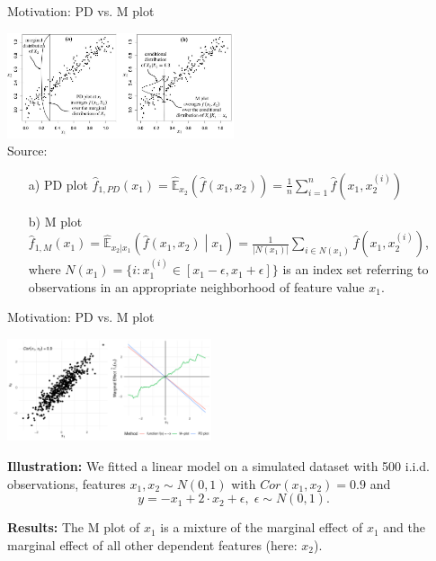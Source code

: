 \documentclass[aspectratio=169]{../latex_main/tntbeamer}  %
\begin{document}
\begin{frame}{Motivation: PD vs. M plot}

\begin{center}
\includegraphics[width=0.5\textwidth]{figure/PD_M.jpg}\\
\tiny{Source: }
\end{center}

\begin{enumerate}
\item[a)] PD plot $\hat{f}_{1, PD}(x_1) = \hat{\mathbb{E}}_{x_2} \left( \hat{f}(x_1, x_2) \right) = \frac{1}{n} \sum_{i=1}^n \hat{f}(x_1, x_2^{(i)})$
\item[b)] M plot $\hat{f}_{1, M}(x_1) = \hat{\mathbb{E}}_{x_2|x_1} \left( \hat{f}(x_1, x_2) \middle| x_1\right) = \frac{1}{|N(x_1)|} \sum\limits_{i \in N(x_1)} \hat{f}(x_1, x_2^{(i)})$, where $N(x_1) = \{i: x_1^{(i)} \in [x_1 - \epsilon, x_1 + \epsilon]\}$ is an index set referring to observations in an appropriate neighborhood of feature value $x_1$.
\end{enumerate}

\end{frame}


\begin{frame}{Motivation: PD vs. M plot}

\begin{center}
\includegraphics[width=0.45\textwidth]{figure/pd_vs_mplot} %
\end{center}

\textbf{Illustration:}
We fitted a linear model on a simulated dataset with 500 i.i.d. observations, features $x_1, x_2 \sim N(0,1)$ with $Cor(x_1, x_2) = 0.9$ and $$y = -x_1 + 2 \cdot x_2 + \epsilon, \; \epsilon \sim N(0,1).$$

\textbf{Results:} The M plot of $x_1$ is a mixture of the marginal effect of $x_1$ and the marginal effect of all other dependent features (here: $x_2$).
\end{frame}
\end{document}
